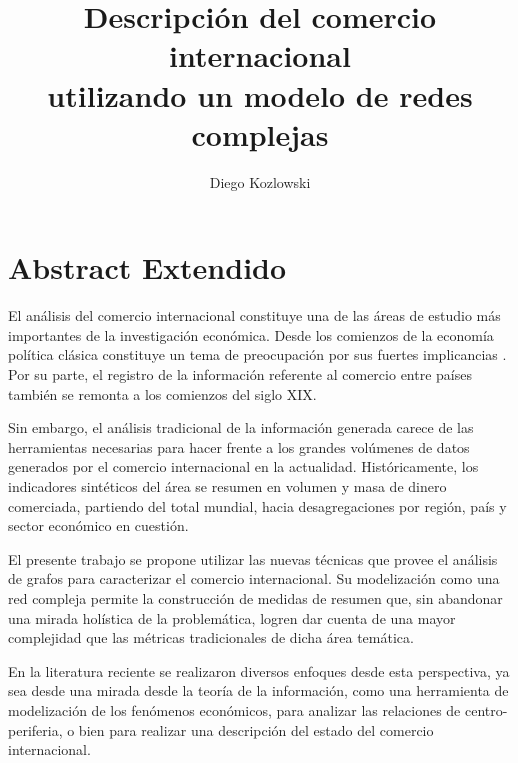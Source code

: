 \documentclass[a4paper]{llncs}
\renewcommand{\cite}[2][]{}
\begin{document}
	
	\mainmatter  %
	
	\title{Descripción del comercio internacional\\utilizando un modelo de redes complejas}
	
	
	
	
	\author{Diego Kozlowski}
	\maketitle
		
	\section{Abstract Extendido}
	
	El análisis del comercio internacional constituye una de las áreas de estudio más importantes de la investigación económica. Desde los comienzos de la economía política clásica constituye un tema de preocupación por sus fuertes implicancias \cite{ricardo1987principios}. Por su parte, el registro de la información referente al comercio entre países también se remonta a los comienzos del siglo XIX.          
	
	Sin embargo, el análisis tradicional de la información generada carece de las herramientas necesarias para hacer frente a los grandes volúmenes de datos generados por el comercio internacional en la actualidad. Históricamente, los indicadores sintéticos del área se resumen en volumen y masa de dinero comerciada, partiendo del total mundial, hacia desagregaciones por región, país y sector económico en cuestión\cite{WTO2017}.                
	
	El presente trabajo se propone utilizar las nuevas técnicas que provee el análisis de grafos para caracterizar el comercio internacional. Su modelización como una red compleja permite la construcción de medidas de resumen que, sin abandonar una mirada holística de la problemática, logren dar cuenta de una mayor complejidad que las métricas tradicionales de dicha área temática. 
	
	En la literatura reciente se realizaron diversos enfoques desde esta perspectiva, ya sea desde una mirada desde la teoría de la información\cite{Bhattacharya2008},  como una herramienta de modelización de los fenómenos económicos\cite{Fan2014}, para analizar las relaciones de centro-periferia\cite{Fagiolo2010}, o bien para realizar una descripción del estado del comercio internacional\cite{Chow2013}. 
	
\end{document}
